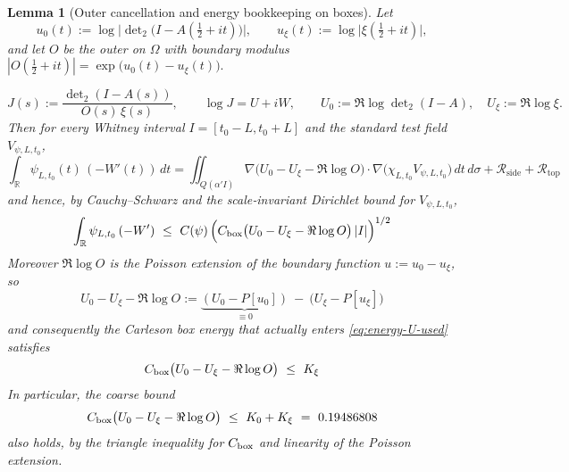 \documentclass[11pt]{article}
\providecommand{\CboxZeta}{K_0 + K_\xi}%
\renewcommand{\CboxZeta}{0.19486808}
\newtheorem{lemma}[theorem]{Lemma}
\theoremstyle{definition}
\theoremstyle{remark}
\newcommand{\R}{\mathbb{R}}
\newcommand{\Poisson}{P}
\begin{document}
\begin{lemma}[Outer cancellation and energy bookkeeping on boxes]\label{lem:outer-energy-bookkeeping}
Let
\[
u_0(t):=\log\Big|\det\nolimits_2\!\big(I-A(\tfrac12+it)\big)\Big|,\qquad
u_\xi(t):=\log\big|\xi(\tfrac12+it)\big|,
\]
and let $O$ be the outer on $\Omega$ with boundary modulus
\(
|O(\tfrac12+it)|=\exp\!\big(u_0(t)-u_\xi(t)\big).
\)
 
\[
J(s):=\frac{\det\nolimits_2(I-A(s))}{O(s)\,\xi(s)},\qquad
\log J=U+iW,\qquad U_0:=\Re\log\det\nolimits_2(I-A),\quad U_\xi:=\Re\log\xi.
\]
Then for every Whitney interval $I=[t_0-L,t_0+L]$ and the standard test field $V_{\psi,L,t_0}$,
\begin{equation}\label{eq:CRG-outer-cancel}
\int_{\R}\psi_{L,t_0}(t)\,(-W'(t))\,dt
=\iint_{Q(\alpha' I)} \nabla\!\big(U_0-U_\xi-\Re\log O\big)\cdot\nabla\!\big(\chi_{L,t_0}V_{\psi,L,t_0}\big)\,dt\,d\sigma
+\mathcal R_{\mathrm{side}}+\mathcal R_{\mathrm{top}}
\end{equation}
and hence, by Cauchy--Schwarz and the scale‑invariant Dirichlet bound for $V_{\psi,L,t_0}$,
\begin{equation}\label{eq:energy-U-used}
\int_{\R}\psi_{L,t_0}\,(-W')\ \le\ C(\psi)\,\Big(C_{\rm box}\big(U_0-U_\xi-\Re\log O\big)\,|I|\Big)^{1/2}
\end{equation}
Moreover $\Re\log O$ is the Poisson extension of the boundary function $u:=u_0-u_\xi$, so
\begin{equation}\label{eq:Poisson-splitting}
U_0-U_\xi-\Re\log O
:=\underbrace{(U_0-\Poisson[u_0])}_{\equiv 0}\ -\ \big(U_\xi-\Poisson[u_\xi]\big)
\end{equation}
and consequently the Carleson box energy that actually enters \eqref{eq:energy-U-used} satisfies
\begin{equation}\label{eq:sharp-Kxi}
C_{\rm box}\big(U_0-U_\xi-\Re\log O\big)\ \le\ K_\xi
\end{equation}
In particular, the coarse bound
\begin{equation}\label{eq:coarse-K0Kxi}
C_{\rm box}\big(U_0-U_\xi-\Re\log O\big)\ \le\ K_0+K_\xi\ =\ \CboxZeta
\end{equation}
also holds, by the triangle inequality for $C_{\rm box}$ and linearity of the Poisson extension.
\end{lemma}
\end{document}
